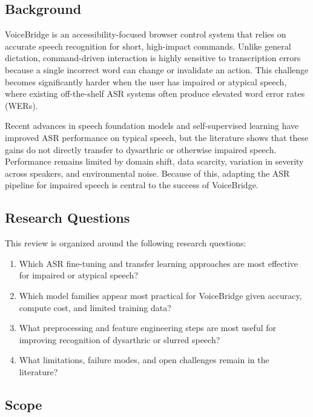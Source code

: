 \documentclass{article}
\begin{document}
\subsection{Background}

VoiceBridge is an accessibility-focused browser control system that relies on accurate speech recognition for short, high-impact commands. Unlike general dictation, command-driven interaction is highly sensitive to transcription errors because a single incorrect word can change or invalidate an action. This challenge becomes significantly harder when the user has impaired or atypical speech, where existing off-the-shelf ASR systems often produce elevated word error rates (WERs).

Recent advances in speech foundation models and self-supervised learning have improved ASR performance on typical speech, but the literature shows that these gains do not directly transfer to dysarthric or otherwise impaired speech. Performance remains limited by domain shift, data scarcity, variation in severity across speakers, and environmental noise. Because of this, adapting the ASR pipeline for impaired speech is central to the success of VoiceBridge.

\subsection{Research Questions}

This review is organized around the following research questions:

\begin{enumerate}
    \item Which ASR fine-tuning and transfer learning approaches are most effective for impaired or atypical speech?
    \item Which model families appear most practical for VoiceBridge given accuracy, compute cost, and limited training data?
    \item What preprocessing and feature engineering steps are most useful for improving recognition of dysarthric or slurred speech?
    \item What limitations, failure modes, and open challenges remain in the literature?
\end{enumerate}

\subsection{Scope}
\end{document}
